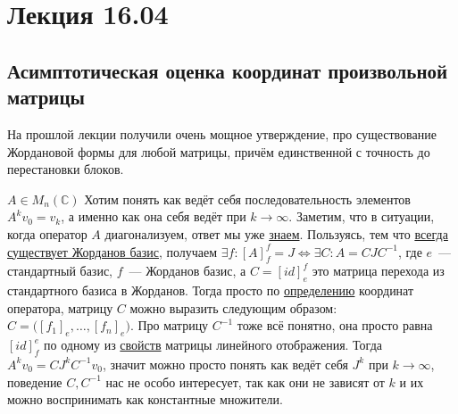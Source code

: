 \section{Лекция 16.04}
\subsection{Асимптотическая оценка координат произвольной матрицы}
\begin{motivation}
    На прошлой лекции получили очень мощное утверждение, про существование Жордановой формы
    для любой матрицы, причём единственной с точность до перестановки блоков.
\end{motivation}
$A \in M_n(\mathbb{C})$ Хотим понять как ведёт себя последовательность элементов
$A^k v_0 = v_k$, а именно как она себя ведёт при $k \to \infty$. Заметим, что
в ситуации, когда оператор $A$ диагонализуем, ответ мы уже 
\hyperref[stm:Ассимптотика диагонализуемого оператора]{знаем}. Пользуясь, тем что 
\hyperref[thm:О жордановом базисе]{всегда существует Жорданов базис}, получаем 
$\exists f\colon [A]^f_f = J \Leftrightarrow \exists C\colon A = C J C^{-1}$, где
$e$~--- стандартный базис, $f$~--- Жорданов базис, а
$C = [id]^f_e $ это матрица перехода из стандартного базиса в Жорданов. Тогда просто
по \hyperref[def:Матрица отображения]{определению} координат оператора, матрицу $C$ можно выразить следующим образом:
$C = \big( [f_1]_e, \dots, [f_n]_e \big)$. Про матрицу $C^{-1}$ тоже всё понятно, она
просто равна $[id]^e_f$ по одному из 
\hyperref[stm:О свойстве матриц линейных отображений]{свойств} матрицы линейного отображения.
Тогда $A^k v_0 = C J^k C^{-1} v_0$, значит можно просто понять как ведёт себя $J^k$ при
$k \to \infty$, поведение $C, C^{-1}$ нас не особо интересует, так как они не зависят от
$k$ и их можно воспринимать как константные множители.

